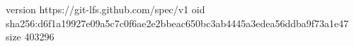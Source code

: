 version https://git-lfs.github.com/spec/v1
oid sha256:d6f1a19927e09a5c7c0f6ae2e2bbeac650bc3ab4445a3edea56ddba9f73a1e47
size 403296
